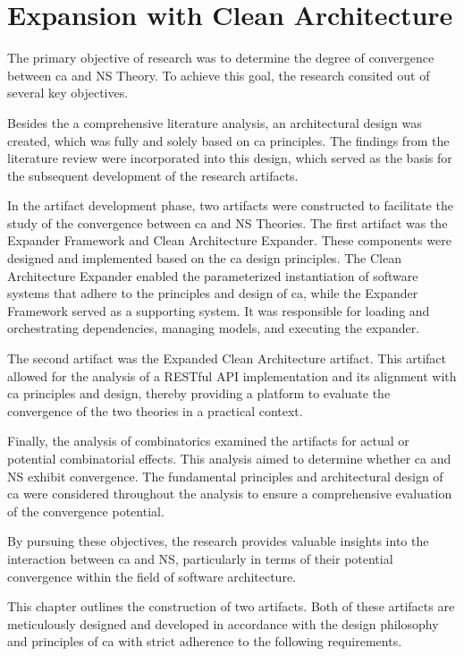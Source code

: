 \section{Expansion with Clean Architecture}

The primary objective of  research was to
determine the degree of convergence between \gls{ca} and NS Theory. To achieve this goal,
the research consited out of several key objectives.

Besides the a comprehensive literature analysis, an architectural design was created,
which was fully and solely based on \gls{ca} principles. The findings from the literature
review were incorporated into this design, which served as the basis for the subsequent
development of the research artifacts.

In the artifact development phase, two artifacts were constructed to facilitate the study
of the convergence between \gls{ca} and NS Theories. The first artifact was the Expander
Framework and Clean Architecture Expander. These components were designed and implemented
based on the \gls{ca} design principles. The Clean Architecture Expander enabled the
parameterized instantiation of software systems that adhere to the principles and design
of \gls{ca}, while the Expander Framework served as a supporting system. It was responsible for
loading and orchestrating dependencies, managing models, and executing the expander.

The second artifact was the Expanded Clean Architecture artifact. This artifact allowed
for the analysis of a RESTful API implementation and its alignment with \gls{ca}
principles and design, thereby providing a platform to evaluate the convergence of the two
theories in a practical context.

Finally, the analysis of combinatorics examined the artifacts for actual or potential
combinatorial effects. This analysis aimed to determine whether \gls{ca} and NS exhibit
convergence. The fundamental principles and architectural design of \gls{ca} were
considered throughout the analysis to ensure a comprehensive evaluation of the convergence
potential.

By pursuing these objectives, the research provides valuable insights into the interaction
between \gls{ca} and NS, particularly in terms of their potential convergence within the field
of software architecture.

This chapter outlines the construction of two artifacts. Both of these artifacts are
meticulously designed and developed in accordance with the design philosophy and
principles of \gls{ca} with strict adherence to the following requirements.